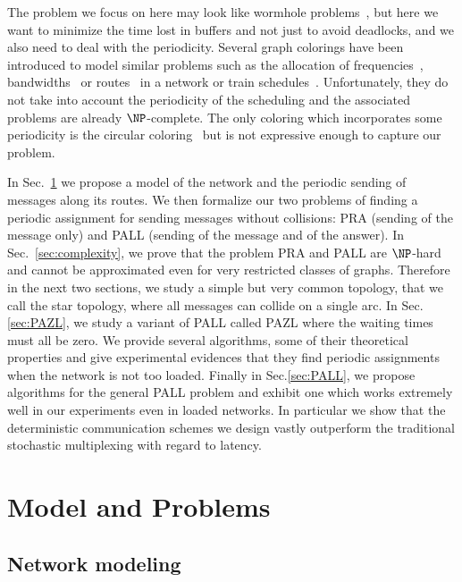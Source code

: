 \documentclass[a4paper,10pt]{article}
\begin{document}
{The problem we focus on here may look like wormhole problems~\cite{cole1996benefit}, but here we want to minimize the time lost in buffers and not just to avoid deadlocks, and we also need to deal with the periodicity. Several graph colorings have been introduced to model similar problems such as the allocation of frequencies~\cite{borndorfer1998frequency}, bandwidths~\cite{erlebach2001complexity} or routes~\cite{cole1996benefit} in a network or train schedules~\cite{strotmann2007railway}. Unfortunately, they do not take into account the periodicity of the scheduling and the associated problems are already $\NP$-complete. The only coloring which incorporates some periodicity is the circular coloring~\cite{zhou2013multiple, zhu2001circular,zhu2006recent} but is not expressive enough to capture our problem.

 In Sec.~\ref{sec:def} we propose a model of the network and the periodic sending of messages along its routes. 
 We then formalize our two problems of finding a periodic assignment for sending messages without collisions: PRA (sending of the message only) and PALL (sending of the message and of the answer).  
In Sec.~\ref{sec:complexity}, we prove that the problem PRA and PALL are $\NP$-hard and cannot be approximated even for very
restricted classes of graphs. 
Therefore in the next two sections, we study a simple but very common topology, that we call the
star topology, where all messages can collide on a single arc.
In Sec.\ref{sec:PAZL}, we study a variant of PALL called PAZL  where the waiting times must all be zero. We provide several algorithms, some of their theoretical properties and give experimental evidences that they find periodic assignments when the network is not too loaded. Finally in Sec.\ref{sec:PALL}, we propose algorithms for the general PALL problem and exhibit one which works extremely well in our experiments even in loaded networks. In particular we show that the deterministic communication schemes we design vastly outperform the traditional stochastic multiplexing with regard to latency. 


\section{Model and Problems}\label{sec:def}

  \subsection{Network modeling}
  

}
\end{document}
